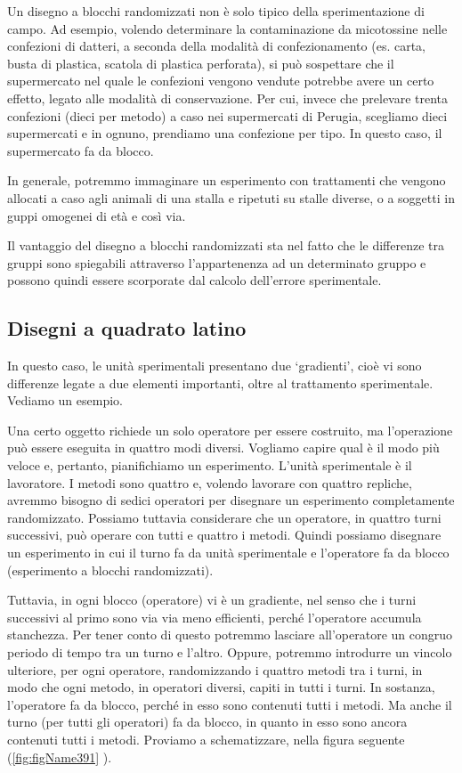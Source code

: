 \documentclass[a4paper,12pt,oneside]{book}
\theoremstyle{definition}
\theoremstyle{definition}
\theoremstyle{definition}
\theoremstyle{remark}
\begin{document}
Un disegno a blocchi randomizzati non è solo tipico della
sperimentazione di campo. Ad esempio, volendo determinare la
contaminazione da micotossine nelle confezioni di datteri, a seconda
della modalità di confezionamento (es. carta, busta di plastica, scatola
di plastica perforata), si può sospettare che il supermercato nel quale
le confezioni vengono vendute potrebbe avere un certo effetto, legato
alle modalità di conservazione. Per cui, invece che prelevare trenta
confezioni (dieci per metodo) a caso nei supermercati di Perugia,
scegliamo dieci supermercati e in ognuno, prendiamo una confezione per
tipo. In questo caso, il supermercato fa da blocco.

In generale, potremmo immaginare un esperimento con trattamenti che
vengono allocati a caso agli animali di una stalla e ripetuti su stalle
diverse, o a soggetti in guppi omogenei di età e così via.

Il vantaggio del disegno a blocchi randomizzati sta nel fatto che le
differenze tra gruppi sono spiegabili attraverso l'appartenenza ad un
determinato gruppo e possono quindi essere scorporate dal calcolo
dell'errore sperimentale.

\subsection{Disegni a quadrato latino}\label{disegni-a-quadrato-latino}

In questo caso, le unità sperimentali presentano due `gradienti', cioè
vi sono differenze legate a due elementi importanti, oltre al
trattamento sperimentale. Vediamo un esempio.

Una certo oggetto richiede un solo operatore per essere costruito, ma
l'operazione può essere eseguita in quattro modi diversi. Vogliamo
capire qual è il modo più veloce e, pertanto, pianifichiamo un
esperimento. L'unità sperimentale è il lavoratore. I metodi sono quattro
e, volendo lavorare con quattro repliche, avremmo bisogno di sedici
operatori per disegnare un esperimento completamente randomizzato.
Possiamo tuttavia considerare che un operatore, in quattro turni
successivi, può operare con tutti e quattro i metodi. Quindi possiamo
disegnare un esperimento in cui il turno fa da unità sperimentale e
l'operatore fa da blocco (esperimento a blocchi randomizzati).

Tuttavia, in ogni blocco (operatore) vi è un gradiente, nel senso che i
turni successivi al primo sono via via meno efficienti, perché
l'operatore accumula stanchezza. Per tener conto di questo potremmo
lasciare all'operatore un congruo periodo di tempo tra un turno e
l'altro. Oppure, potremmo introdurre un vincolo ulteriore, per ogni
operatore, randomizzando i quattro metodi tra i turni, in modo che ogni
metodo, in operatori diversi, capiti in tutti i turni. In sostanza,
l'operatore fa da blocco, perché in esso sono contenuti tutti i metodi.
Ma anche il turno (per tutti gli operatori) fa da blocco, in quanto in
esso sono ancora contenuti tutti i metodi. Proviamo a schematizzare,
nella figura seguente (\ref{fig:figName391} ).
\end{document}
